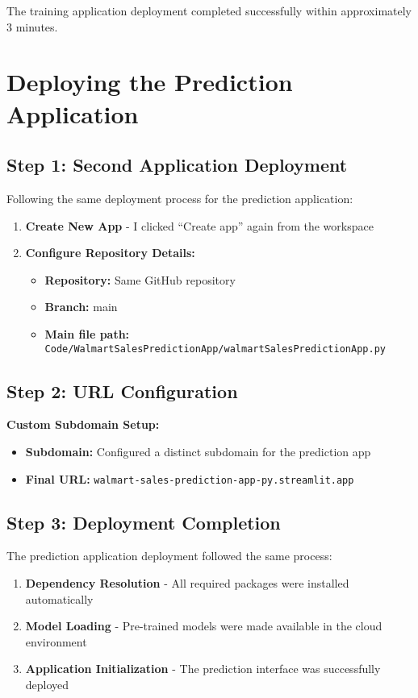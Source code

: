 The training application deployment completed successfully within approximately 3 minutes.

\section{Deploying the Prediction Application}

\subsection{Step 1: Second Application Deployment}

Following the same deployment process for the prediction application:

\begin{enumerate}
\item \textbf{Create New App} - I clicked ``Create app'' again from the workspace
\item \textbf{Configure Repository Details:}
\begin{itemize}
\item \textbf{Repository:} Same GitHub repository
\item \textbf{Branch:} main
\item \textbf{Main file path:} 
\texttt{Code/WalmartSalesPredictionApp/walmartSalesPredictionApp.py}
\end{itemize}
\end{enumerate}

\subsection{Step 2: URL Configuration}

\textbf{Custom Subdomain Setup:}
\begin{itemize}
\item \textbf{Subdomain:} Configured a distinct subdomain for the prediction app
\item \textbf{Final URL:} \texttt{walmart-sales-prediction-app-py.streamlit.app}
\end{itemize}

\subsection{Step 3: Deployment Completion}

The prediction application deployment followed the same process:

\begin{enumerate}
\item \textbf{Dependency Resolution} - All required packages were installed automatically
\item \textbf{Model Loading} - Pre-trained models were made available in the cloud environment
\item \textbf{Application Initialization} - The prediction interface was successfully deployed
\end{enumerate}

